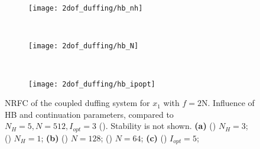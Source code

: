 \begin{figure}[ht!]
  \centering
  \begin{subfigure}[b]{0.7\textwidth}
    \texttt{[image: 2dof\_duffing/hb\_nh]}
    \caption{}
    \label{fig:hb_frf_a_appendix}
  \end{subfigure}\\
  \begin{subfigure}[b]{0.45\textwidth}
    \texttt{[image: 2dof\_duffing/hb\_N]}
    \caption{}
    \label{fig:hb_frf_b_appendix}
  \end{subfigure}~
  \begin{subfigure}[b]{0.45\textwidth}
    \texttt{[image: 2dof\_duffing/hb\_ipopt]}
    \caption{}
    \label{fig:hb_frf_c_appendix}
  \end{subfigure}
  \caption{NRFC of the coupled duffing system for $x_1$ with $f=2$N. Influence
    of HB and continuation parameters, compared to $N_H=5, N=512, I_{opt}=3$ (\sampleline{}).
    Stability is not shown.
    \textbf{(a)}
    () $N_H=3$;
    () $N_H=1$;
    \textbf{(b)}
    () $N=128$;
    () $N=64$;
    \textbf{(c)}
    () $I_{opt}=5$;}
  \label{fig:hb_frf_appendix}
\end{figure}




